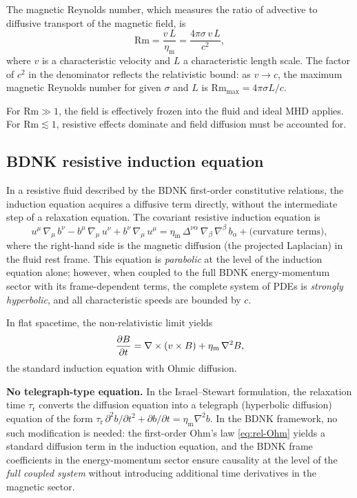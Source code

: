 The magnetic Reynolds number, which measures the ratio of advective to
diffusive transport of the magnetic field, is
\begin{equation}
  \mathrm{Rm} = \frac{v\,L}{\eta_{\mathrm{m}}}
  = \frac{4\pi\sigma\,v\,L}{c^{2}},
  \label{eq:Rm-rel}
\end{equation}
where $v$ is a characteristic velocity and $L$ a characteristic length
scale.  The factor of $c^{2}$ in the denominator reflects the relativistic
bound: as $v\to c$, the maximum magnetic Reynolds number for given $\sigma$
and $L$ is $\mathrm{Rm}_{\max} = 4\pi\sigma L/c$.

For $\mathrm{Rm}\gg 1$, the field is effectively frozen into the fluid
and ideal MHD applies.  For $\mathrm{Rm}\lesssim 1$, resistive effects
dominate and field diffusion must be accounted for.

\subsection{BDNK resistive induction equation}

In a resistive fluid described by the BDNK first-order constitutive
relations, the induction equation acquires a diffusive term directly,
without the intermediate step of a relaxation equation.  The covariant
resistive induction equation is
\begin{equation}
  u^{\mu}\,\nabla_{\mu}\,b^{\nu}
  - b^{\mu}\,\nabla_{\mu}\,u^{\nu}
  + b^{\nu}\,\nabla_{\mu}\,u^{\mu}
  = \eta_{\mathrm{m}}\,\Delta^{\nu\alpha}\,
    \nabla_{\beta}\,\nabla^{\beta}\,b_{\alpha}
  + \text{(curvature terms)},
  \label{eq:induction-resistive}
\end{equation}
where the right-hand side is the magnetic diffusion (the projected
Laplacian) in the fluid rest frame.  This equation is \emph{parabolic}
at the level of the induction equation alone; however, when coupled to
the full BDNK energy-momentum sector with its frame-dependent terms,
the complete system of PDEs is \emph{strongly hyperbolic}, and all
characteristic speeds are bounded by $c$.

In flat spacetime, the non-relativistic limit yields
\begin{equation}
  \frac{\partial B}{\partial t}
  = \nabla\times(v\times B)
  + \eta_{\mathrm{m}}\,\nabla^{2}B,
  \label{eq:induction-NR}
\end{equation}
the standard induction equation with Ohmic diffusion.

\medskip\noindent
\textbf{No telegraph-type equation.}\quad
In the Israel--Stewart formulation, the relaxation time
$\tau_{\mathrm{r}}$ converts the diffusion equation into a telegraph
(hyperbolic diffusion) equation of the form
$\tau_{\mathrm{r}}\,\partial^{2}b/\partial t^{2}
+ \partial b/\partial t = \eta_{\mathrm{m}}\nabla^{2}b$.
In the BDNK framework, no such modification is needed: the first-order
Ohm's law \eqref{eq:rel-Ohm} yields a standard diffusion term in the
induction equation, and the BDNK frame coefficients in the energy-momentum
sector ensure causality at the level of the \emph{full coupled system}
without introducing additional time derivatives in the magnetic sector.

